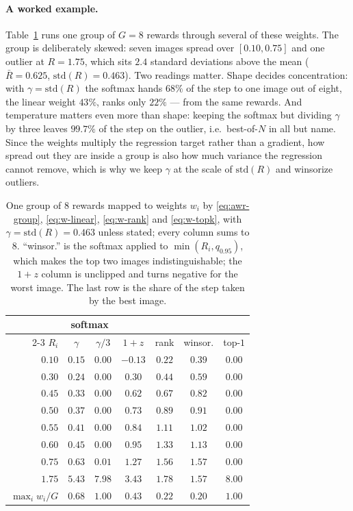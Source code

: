 \documentclass[10pt]{article} %
\begin{document}
\paragraph{A worked example.}
Table~\ref{tab:numeric} runs one group of $G=8$ rewards through several of these weights. The group is
deliberately skewed: seven images spread over $[0.10,0.75]$ and one outlier at $R=1.75$, which sits $2.4$
standard deviations above the mean ($\bar{R}=0.625$, $\mathrm{std}(R)=0.463$). Two readings matter. Shape
decides concentration: with $\gamma=\mathrm{std}(R)$ the softmax hands $68\%$ of the step to one image out
of eight, the linear weight $43\%$, ranks only $22\%$ --- from the same rewards. And temperature matters
even more than shape: keeping the softmax but dividing $\gamma$ by three leaves $99.7\%$ of the step on
the outlier, i.e.\ best-of-$N$ in all but name. Since the weights multiply the regression target rather
than a gradient, how spread out they are inside a group is also how much variance the regression cannot
remove, which is why we keep $\gamma$ at the scale of $\mathrm{std}(R)$ and winsorize outliers.

\begin{table}[t]
\centering
\small
\setlength{\tabcolsep}{6pt}
\caption{One group of $8$ rewards mapped to weights $w_i$ by \eqref{eq:awr-group}, \eqref{eq:w-linear},
\eqref{eq:w-rank} and \eqref{eq:w-topk}, with $\gamma=\mathrm{std}(R)=0.463$ unless stated; every column
sums to $8$. ``winsor.'' is the softmax applied to $\min(R_i,q_{0.95})$, which makes the top two images
indistinguishable; the $1+z$ column is unclipped and turns negative for the worst image. The last row
is the share of the step taken by the best image.}
\label{tab:numeric}
\begin{tabular}{@{}rcccccc@{}}
\toprule
& \multicolumn{2}{c}{softmax} & & & & \\
\cmidrule(lr){2-3}
$R_i$ & $\gamma$ & $\gamma/3$ & $1+z$ & rank & winsor. & top-$1$ \\
\midrule
$0.10$ & $0.15$ & $0.00$ & $-0.13$ & $0.22$ & $0.39$ & $0.00$ \\
$0.30$ & $0.24$ & $0.00$ & $0.30$ & $0.44$ & $0.59$ & $0.00$ \\
$0.45$ & $0.33$ & $0.00$ & $0.62$ & $0.67$ & $0.82$ & $0.00$ \\
$0.50$ & $0.37$ & $0.00$ & $0.73$ & $0.89$ & $0.91$ & $0.00$ \\
$0.55$ & $0.41$ & $0.00$ & $0.84$ & $1.11$ & $1.02$ & $0.00$ \\
$0.60$ & $0.45$ & $0.00$ & $0.95$ & $1.33$ & $1.13$ & $0.00$ \\
$0.75$ & $0.63$ & $0.01$ & $1.27$ & $1.56$ & $1.57$ & $0.00$ \\
$1.75$ & $5.43$ & $7.98$ & $3.43$ & $1.78$ & $1.57$ & $8.00$ \\
\midrule
$\max_i w_i/G$ & $0.68$ & $1.00$ & $0.43$ & $0.22$ & $0.20$ & $1.00$ \\
\bottomrule
\end{tabular}
\end{table}
\end{document}
